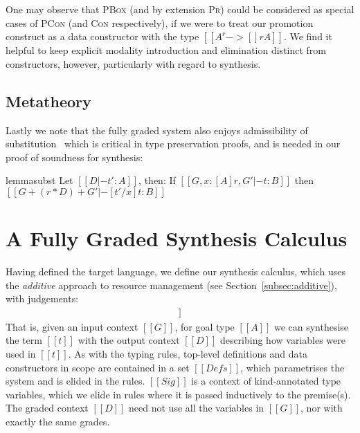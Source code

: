 One may observe that \textsc{PBox} (and by extension \textsc{Pr}) could be
considered as special cases of \textsc{PCon} (and \textsc{Con} respectively), if
we were to treat our promotion construct as a data constructor with the type $[[
A ^ r -> {[] r A} ]]$. We find it helpful to keep explicit modality introduction
and elimination distinct from constructors, however, particularly with regard to
synthesis.

\subsection{Metatheory}
Lastly we note that the fully graded system also enjoys admissibility of
substitution~\citep{DBLP:journals/pacmpl/AbelB20}
which is critical in type preservation proofs,
and is needed in our proof of soundness for synthesis:
%
\begin{restatable}{lemma}{subst}
\label{lemma:substitution}
Let $[[ D |- t' : A]]$, then:
If $[[ {G, x : [A] r} , G' |- t : B]]$
then $[[ G + (r * D) + G' |- [ t' / x ] t : B ]]$
\end{restatable}


\section{A Fully Graded Synthesis Calculus}
\label{section:graded-base-synthesis}

Having defined the target language, we define our synthesis calculus, which uses
the \emph{additive} approach to resource management (see
Section~\ref{subsec:additive}), with judgements:
%
\begin{align*}
[[ Sig; G |- A =>+ t ; D ]]
\end{align*}
%
That is, given an input context $[[ G ]]$, for goal type $[[ A ]]$ we can
synthesise the term $[[ t ]]$ with the output context $[[ D ]]$ describing how
variables were used in $[[ t ]]$. As with the typing rules, top-level
definitions and data constructors in scope are contained in a set $[[ Defs ]]$,
which parametrises the system and is elided in the rules. $[[ Sig ]]$ is a
context of kind-annotated type variables, which we elide in rules where it is
passed inductively to the premise(s). The graded context $[[ D ]]$ need not use
all the variables in $[[ G ]]$, nor with exactly the same grades. 

